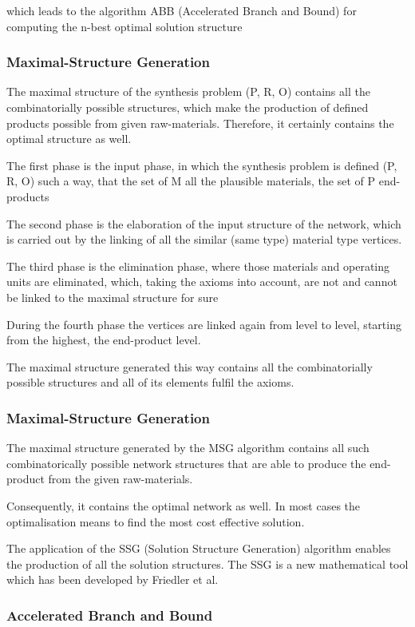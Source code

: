 which leads to the algorithm ABB (Accelerated Branch and Bound) for computing the n-best optimal solution structure
\subsubsection{Maximal-Structure Generation}
The maximal structure of the synthesis problem (P, R, O) contains all the combinatorially possible structures, which make the production of defined products possible from given raw-materials. Therefore, it certainly contains the optimal structure as well.

The first phase is the input phase, in which the synthesis problem is defined (P, R, O) such a way, that the set of M all the plausible materials, the set of P end-products 

The second phase is the elaboration of the input structure of the network, which is carried out by the linking of all the similar (same type) material type vertices.

The third phase is the elimination phase, where those materials and operating units are eliminated, which, taking the  axioms into account, are not and cannot be linked to the maximal structure for sure

During the fourth phase the vertices are linked again from level to level, starting from the highest, the end-product level.

The maximal structure generated this way contains all the combinatorially possible structures and all of its elements fulfil the  axioms.
\subsubsection{Maximal-Structure Generation}
The maximal structure generated by the MSG algorithm contains all such combinatorically possible network structures that are able to produce the end-product from the given raw-materials.

Consequently, it contains the optimal network as well. In most cases the optimalisation means to find the most cost effective solution.

The application of the SSG (Solution Structure Generation) algorithm enables the production of all the solution structures. The SSG is a new mathematical tool  which has been developed by Friedler et al.

\subsubsection{Accelerated Branch and Bound}

